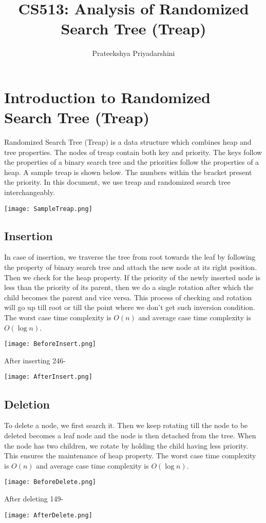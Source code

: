 \documentclass{article}
\title{CS513: Analysis of Randomized Search Tree (Treap)}
\date{}
\author{Prateekshya Priyadarshini}
\affil{M.Tech CSE}
\begin{document}
\tableofcontents
\newpage
{}
\maketitle

\section{Introduction to Randomized Search Tree (Treap)}
Randomized Search Tree (Treap) is a data structure which combines heap and tree properties. The nodes of treap contain both key and priority. The keys follow the properties of a binary search tree and the priorities follow the properties of a heap. A sample treap is shown below. The numbers within the bracket present the priority. In this document, we use treap and randomized search tree interchangeably.
\begin{center}
\texttt{[image: SampleTreap.png]}
\end{center}

\subsection{Insertion}
\label{insert}
In case of insertion, we traverse the tree from root towards the leaf by following the property of binary search tree and attach the new node at its right position. Then we check for the heap property. If the priority of the newly inserted node is less than the priority of its parent, then we do a single rotation after which the child becomes the parent and vice versa. This process of checking and rotation will go up till root or till the point where we don't get such inversion condition. The worst case time complexity is $O(n)$ and average case time complexity is $O(\log n)$.\newline
\begin{center}
\texttt{[image: BeforeInsert.png]}
\end{center}
After inserting 246-
\begin{center}
\texttt{[image: AfterInsert.png]}
\end{center}

\subsection{Deletion}
\label{delete}
To delete a node, we first search it. Then we keep rotating till the node to be deleted becomes a leaf node and the node is then detached from the tree. When the node has two children, we rotate by holding the child having less priority. This ensures the maintenance of heap property. The worst case time complexity is $O(n)$ and average case time complexity is $O(\log n)$.
\begin{center}
\texttt{[image: BeforeDelete.png]}
\end{center}
After deleting 149-
\begin{center}
\texttt{[image: AfterDelete.png]}
\end{center}
\end{document}
